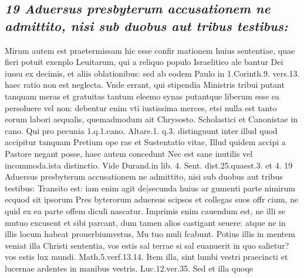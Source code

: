 \documentclass{article}
\begin{document}
\begin{pages}
\subsection*{\textit{19 Aduersus presbyterum accusationem ne admittito, nisi sub duobus aut tribus testibus:}}Mirum autem est praetermissam hic esse confir mationem huius sententiae, quae fieri potuit exenplo Leuitarum, qui a reliquo populo Israelitico ale bantur Dei iussu ex decimis, et aliis oblationibus: sed ab eodem Paulo in 1.Corinth.9. vers.13. haec ratio non est neglecta. Vnde errant, qui stipendia Ministris tribui putant tanquam meras et gratuitas tantum eleemo synas putantque liberum esse ea persoluere vel non: debentur enim vti iustissima merces, etsi nulla est tanto eorum labori aequalis, quemadmodum ait Chrysosto. Scholastici et Canonistae in cano. Qui pro pecunia 1.q.1.cano. Altare.1. q.3. distinguunt inter illud quod accipitur tanquam Pretium ope rae et Sustentatio vitae, Illud quidem accipi a Pastore negant posse, haec autem concedunt Nec est sane inutilis vel incommoda.ista distinctio. Vide Durand.in lib. 4. Sent. dist.25.quaest.3. et 4. 19 Aduersus presbyterum accusationem ne admittito, nisi sub duobus aut tribus testibus: Transito est: iam enim agit de|secunda huius ar gumenti parte nimirum ecquod sit ipsorum Pres byterorum aduersus scipsos et collegas suos offr cium, ne quid ex ea parte offem diculi nascatur. Imprimis enim cauendum est, ne illi se mutuo excusent et sibi parcant, dum tamen alios castigant seuere: atque ne in illis locum habeat prouerbiumvetus, Mu tuo muli fcabunt. Potius illis in mentem veniat illa Christi sententia, vos estis sal terrae si sal euanuerit in quo salietur? vos estis lux mundi. Math.5.verf.13.14. Item illa, sint lumbi vestri praecincti et lucernae ardentes in manibus vestris. Luc.12.ver.35. Sed et illa quoqe  \pend

\end{pages}
\end{document}
